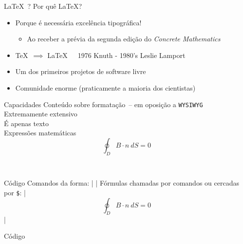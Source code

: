 \documentclass{beamer}
\begin{document}
  \begin{frame}{\LaTeX\ ?}
    Por quê \LaTeX?\\\pause
    \begin{itemize}
      \item{\selectfont Porque é necessária excelência tipográfica!\pause
        \begin{itemize}
          \item Ao receber a prévia da segunda edição do {\em Concrete Mathematics}\pause
        \end{itemize}}
      \item \TeX\ $\implies$ \LaTeX\ \ \ \scriptsize{1976 Knuth - 1980's Leslie Lamport}\pause
      \item Um dos primeiros projetos de software livre\pause
      \item Comunidade enorme (praticamente a maioria dos cientistas)
    \end{itemize}
  \end{frame}
  \begin{frame}[fragile]{Capacidades}
     Conteúdo sobre formatação\pause\ {\scriptsize-- em oposição a \texttt{WYSIWYG}}\\\pause
    \onslide<3>{$ \rightarrow $} Extremamente extensivo\\\pause
     É apenas texto\\\pause
     Expressões matemáticas\\\pause 
      $$ \oint_{D} B\cdot n\ dS = 0 $$
    \begin{center}
      \pause\href{doc/rogers}{}\\
    \end{center}
\end{frame}
  \begin{frame}[fragile]{Código}
    Comandos da forma: |  |\pause
    Fórmulas chamadas por comandos ou cercadas por {\texttt \$}: |$$ \oint_{D} B\cdot n\ dS = 0 $$|
\end{frame}
  \begin{frame}[fragile]{Código}
    \pause
\end{frame}
\end{document}
